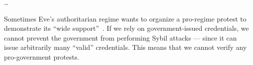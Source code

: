 \dots

Sometimes Eve's authoritarian regime wants to organize a pro-regime protest to 
demonstrate its \enquote{wide 
  support}~\cite[e.g.][]{AlJazeeraOnVenezuela2017,VenezuelanStateWorkersCalledToParticipate}.
If we rely on government-issued credentials, we cannot prevent the government 
from performing Sybil attacks --- since it can issue arbitrarily many 
\enquote{valid} credentials.
This means that we cannot verify any pro-government protests.

